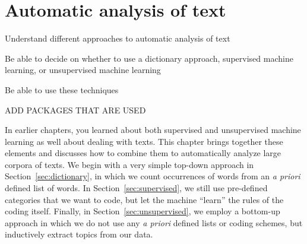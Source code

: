 \chapter{ Automatic analysis of text}
\label{chap:text}



\begin{abstract}{Abstract}
  In this chapter, we discuss different approaches to the automatic analysis of text; or automated content analysis. We combine techniques from earlier chapters, such as transforming texts into a matrix of term frequencies and machine learning. In particular, we describe three different approaches (dictionary-based analyses, supervised machine learning, unsupervised machine learning). The chapter provides guidance on how to conduct such analyses, and also on how to decide which of the approaches is most suitable for which types of questions.
\end{abstract}


\begin{objectives}
\item Understand different approaches to automatic analysis of text
\item Be able to decide on whether to use a dictionary approach, supervised machine learning, or unsupervised machine learning
\item Be able to use these techniques
\end{objectives}


\newpage
\begin{feature}

  ADD PACKAGES THAT ARE USED
\end{feature}














In earlier chapters, you learned about both supervised and unsupervised machine learning as well about dealing with texts.
This chapter brings together these elements and discusses how to combine them to automatically analyze large corpora of texts. We begin with a very simple top-down approach in Section~\ref{sec:dictionary}, in which we count occurrences of words from an \emph{a priori} defined list of words. In Section~\ref{sec:supervised}, we still use pre-defined categories that we want to code, but let the machine ``learn'' the rules of the coding itself. Finally, in Section~\ref{sec:unsupervised}, we employ a bottom-up approach in which we do not use any \emph{a priori} defined lists or coding schemes, but inductively extract topics from our data.








